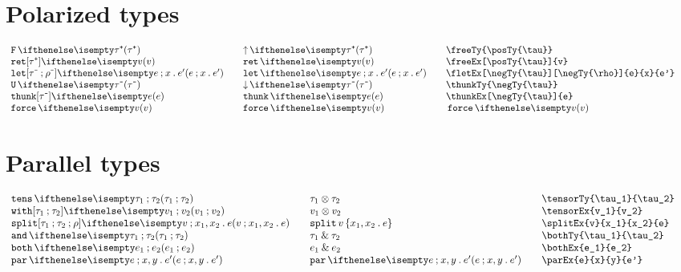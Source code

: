 \documentclass[11pt]{article}
\begin{document}
\section*{Polarized types}
\begin{small}
  \begin{displaymath}
    \begin{array}{l@{\qquad}l@{\qquad}l@{\qquad}l}
      \freeTy{\posTy{\tau}}                         & \freeTy*{\posTy{\tau}}    & \verb|\freeTy{\posTy{\tau}}|                         \\
      \freeEx[\posTy{\tau}]{v}                      & \freeEx*[\posTy{\tau}]{v} & \verb|\freeEx[\posTy{\tau}]{v}|                      \\
      \fletEx[\negTy{\tau}][\negTy{\rho}]{e}{x}{e'} & \fletEx*{e}{x}{e'}        & \verb|\fletEx[\negTy{\tau}][\negTy{\rho}]{e}{x}{e'}| \\
      \thunkTy{\negTy{\tau}}                        & \thunkTy*{\negTy{\tau}}   & \verb|\thunkTy{\negTy{\tau}}|                        \\
      \thunkEx[\negTy{\tau}]{e}                     & \thunkEx*{e}              & \verb|\thunkEx[\negTy{\tau}]{e}|                     \\
      \forceEx{v}                                   & \forceEx*{v}              & \verb||\forceEx{v}
    \end{array}
  \end{displaymath}
\end{small}

\section*{Parallel types}
\begin{small}
  \begin{displaymath}
    \begin{array}{l@{\qquad}l@{\qquad}l@{\qquad}l}
      \tensorTy{\tau_1}{\tau_2} & \tensorTy*{\tau_1}{\tau_2} & \verb|\tensorTy{\tau_1}{\tau_2}| \\
      \tensorEx{v_1}{v_2}       & \tensorEx*{v_1}{v_2}       & \verb|\tensorEx{v_1}{v_2}|       \\
      \splitEx{v}{x_1}{x_2}{e}  & \splitEx*{v}{x_1}{x_2}{e}  & \verb|\splitEx{v}{x_1}{x_2}{e}|  \\
      \bothTy{\tau_1}{\tau_2}   & \bothTy*{\tau_1}{\tau_2}   & \verb|\bothTy{\tau_1}{\tau_2}|   \\
      \bothEx{e_1}{e_2}         & \bothEx*{e_1}{e_2}         & \verb|\bothEx{e_1}{e_2}|         \\
      \parEx{e}{x}{y}{e'}       & \parEx*{e}{x}{y}{e'}       & \verb|\parEx{e}{x}{y}{e'}|
    \end{array}
  \end{displaymath}
\end{small}
\end{document}
